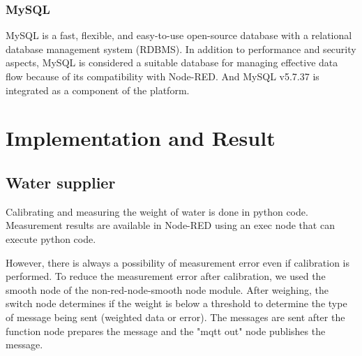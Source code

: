 \documentclass[conference]{IEEEtran}
\begin{document}
\subsubsection{MySQL}
MySQL is a fast, flexible, and easy-to-use open-source database with a relational database management system (RDBMS).
In addition to performance and security aspects, MySQL is considered a suitable database for managing effective data flow because of its compatibility with Node-RED.
And MySQL v5.7.37 is integrated as a component of the platform.

\section{Implementation and Result}
\subsection{Water supplier}
Calibrating and measuring the weight of water is done in python code.
Measurement results are available in Node-RED using an exec node that can execute python code.

However, there is always a possibility of measurement error even if calibration is performed.
To reduce the measurement error after calibration, we used the smooth node of the non-red-node-smooth node module.
After weighing, the switch node determines if the weight is below a threshold to determine the type of message being sent (weighted data or error).
The messages are sent after the function node prepares the message and the "mqtt out" node publishes the message.

\end{document}
